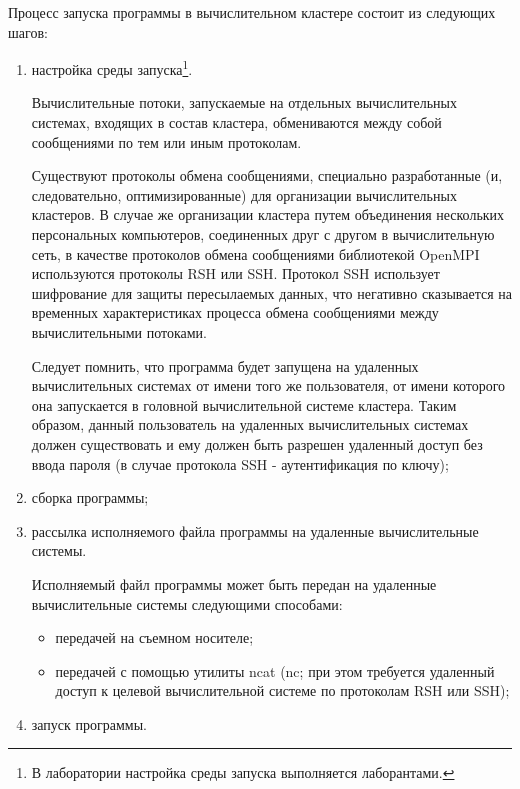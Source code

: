 Процесс запуска программы в вычислительном кластере состоит из следующих шагов:

\begin{enumerate}

	\item настройка среды запуска\footnote{В лаборатории настройка среды запуска выполняется лаборантами.}.

	Вычислительные потоки, запускаемые на отдельных вычислительных системах, входящих в состав кластера, обмениваются между собой сообщениями по тем или иным протоколам.

	Существуют протоколы обмена сообщениями, специально разработанные (и, следовательно, оптимизированные) для организации вычислительных кластеров. В случае же организации кластера путем объединения нескольких персональных компьютеров, соединенных друг с другом в вычислительную сеть, в качестве протоколов обмена сообщениями библиотекой OpenMPI используются протоколы RSH или SSH. Протокол SSH использует шифрование для защиты пересылаемых данных, что негативно сказывается на временных характеристиках процесса обмена сообщениями между вычислительными потоками.

	Следует помнить, что программа будет запущена на удаленных вычислительных системах от имени того же пользователя, от имени которого она запускается в головной вычислительной системе кластера. Таким образом, данный пользователь на удаленных вычислительных системах должен существовать и ему должен быть разрешен удаленный доступ без ввода пароля (в случае протокола SSH - аутентификация по ключу);

	\item сборка программы;

	\item рассылка исполняемого файла программы на удаленные вычислительные системы.

	Исполняемый файл программы может быть передан на удаленные вычислительные системы следующими способами:

	\begin{itemize}

		\item передачей на съемном носителе;
		\item передачей с помощью утилиты ncat (nc; при этом требуется удаленный доступ к целевой вычислительной системе по протоколам RSH или SSH);

	\end{itemize}

	\item запуск программы.


\end{enumerate}
